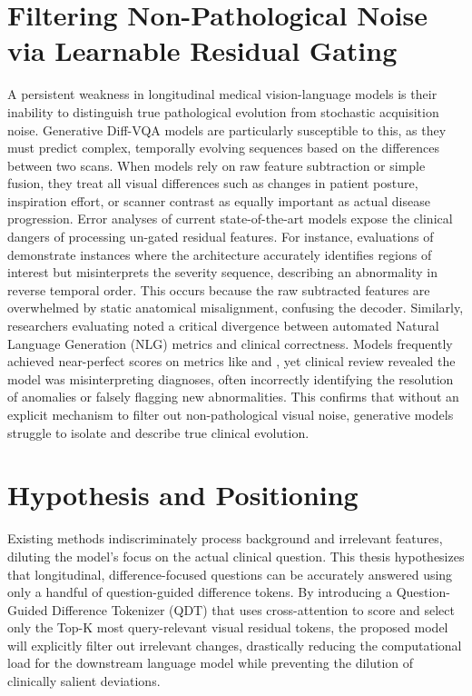 \section{Filtering Non-Pathological Noise via Learnable Residual Gating}
A persistent weakness in longitudinal medical vision-language models is their inability to distinguish true pathological evolution from stochastic acquisition noise. Generative Diff-VQA models are particularly susceptible to this, as they must predict complex, temporally evolving sequences based on the differences between two scans. When models rely on raw feature subtraction or simple fusion, they treat all visual differences such as changes in patient posture, inspiration effort, or scanner contrast as equally important as actual disease progression. Error analyses of current state-of-the-art models expose the clinical dangers of processing un-gated residual features. For instance, evaluations of \cite{plural} demonstrate instances where the architecture accurately identifies regions of interest but misinterprets the severity sequence, describing an abnormality in reverse temporal order. This occurs because the raw subtracted features are overwhelmed by static anatomical misalignment, confusing the decoder. Similarly, researchers evaluating \cite{encoder-decoder} noted a critical divergence between automated Natural Language Generation (NLG) metrics and clinical correctness. Models frequently achieved near-perfect scores on metrics like \cite{bleu} and \cite{rouge}, yet clinical review revealed the model was misinterpreting diagnoses, often incorrectly identifying the resolution of anomalies or falsely flagging new abnormalities. This confirms that without an explicit mechanism to filter out non-pathological visual noise, generative models struggle to isolate and describe true clinical evolution.


\section{Hypothesis and Positioning}
Existing methods indiscriminately process background and irrelevant features, diluting the model's focus on the actual clinical question. This thesis hypothesizes that longitudinal, difference-focused questions can be accurately answered using only a handful of question-guided difference tokens. By introducing a Question-Guided Difference Tokenizer (QDT) that uses cross-attention to score and select only the Top-K most query-relevant visual residual tokens, the proposed model will explicitly filter out irrelevant changes, drastically reducing the computational load for the downstream language model while preventing the dilution of clinically salient deviations.

